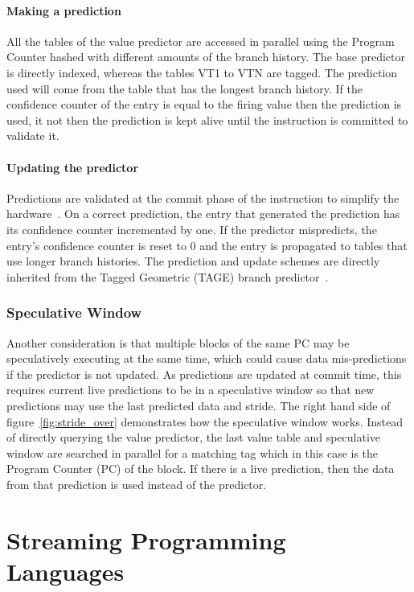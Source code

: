 \paragraph*{Making a prediction}
All the tables of the value predictor are accessed in parallel using the Program Counter hashed with different amounts of the branch history.
The base predictor is directly indexed, whereas the tables VT1 to VTN are tagged.
The prediction used will come from the table that has the longest branch history.
If the confidence counter of the entry is equal to the firing value then the prediction is used, it not then the prediction is kept alive until the instruction is committed to validate it.

\paragraph*{Updating the predictor}
Predictions are validated at the commit phase of the instruction to simplify the hardware~\cite{peraisVTAGE2014}.
On a correct prediction, the entry that generated the prediction has its confidence counter incremented by one.
If the predictor mispredicts, the entry's confidence counter is reset to 0 and the entry is propagated to tables that use longer branch histories.
The prediction and update schemes are directly inherited from the Tagged Geometric (TAGE) branch predictor~\cite{SeznecITTAGE}.

\subsubsection{Speculative Window}
Another consideration is that multiple blocks of the same PC may be speculatively executing at the same time, which could cause data mis-predictions if the predictor is not updated.
As predictions are updated at commit time, this requires current live predictions to be in a speculative window so that new predictions may use the last predicted data and stride.
The right hand side of figure~\ref{fig:stride_over} demonstrates how the speculative window works. 
Instead of directly querying the value predictor, the last value table and speculative window are searched in parallel for a matching tag which in this case is the Program Counter (PC) of the block.
If there is a live prediction, then the data from that prediction is used instead of the predictor.



\section{Streaming Programming Languages}~\label{sec:bg:stream}

